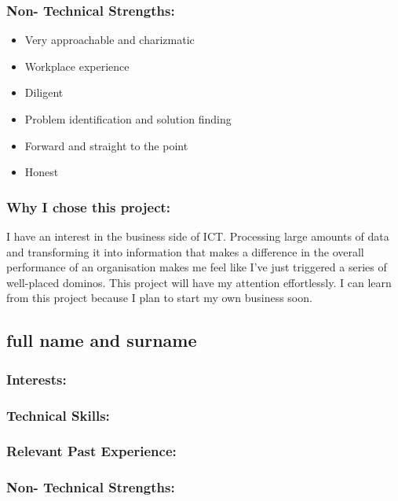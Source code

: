 \subsubsection{Non- Technical Strengths:}
\begin{itemize}
	\item Very approachable and charizmatic
	\item Workplace experience
	\item Diligent
	\item Problem identification and solution finding
	\item Forward and straight to the point
	\item Honest
\end{itemize}

\subsubsection{Why I chose this project:}
\par{I have an interest in the business side of ICT. Processing large amounts of data and transforming it into information that makes a difference in the overall performance of an organisation makes me feel like I've just triggered a series of well-placed dominos. This project will have my attention effortlessly. I can learn from this project because I plan to start my own business soon.}

\newpage
\subsection{full name and surname}

\subsubsection{Interests:}

\subsubsection{Technical Skills:}

\subsubsection{Relevant Past Experience:}

\subsubsection{Non- Technical Strengths:}


